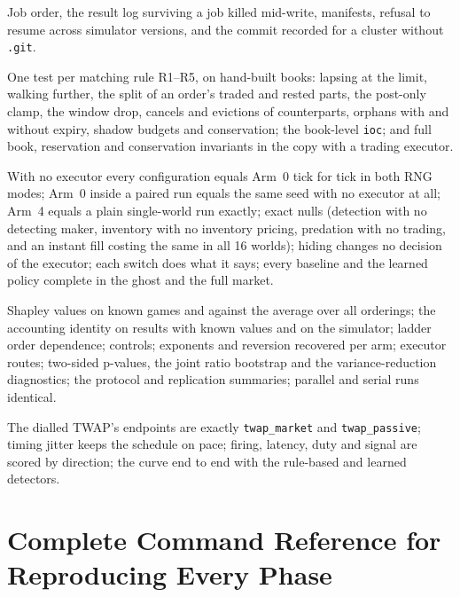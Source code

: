 \documentclass[11pt,a4paper]{article}
\newcommand{\code}[1]{\texttt{#1}}
\begin{document}
\begin{description}[nosep]
\item[\code{test\_runner.py}] Job order, the result log surviving a job killed mid-write, manifests, refusal to resume across simulator versions, and the commit recorded for a cluster without \code{.git}.
\item[\code{test\_ghost.py}] One test per matching rule R1--R5, on hand-built books: lapsing at the limit, walking further, the split of an order's traded and rested parts, the post-only clamp, the window drop, cancels and evictions of counterparts, orphans with and without expiry, shadow budgets and conservation; the book-level \code{ioc}; and full book, reservation and conservation invariants in the copy with a trading executor.
\item[\code{test\_counterfactual.py}] With no executor every configuration equals Arm~0 tick for tick in both RNG modes; Arm~0 inside a paired run equals the same seed with no executor at all; Arm~4 equals a plain single-world run exactly; exact nulls (detection with no detecting maker, inventory with no inventory pricing, predation with no trading, and an instant fill costing the same in all 16 worlds); hiding changes no decision of the executor; each switch does what it says; every baseline and the learned policy complete in the ghost and the full market.
\item[\code{test\_decomposition.py} (\code{papers/decomposition/tests/})] Shapley values on known games and against the average over all orderings; the accounting identity on results with known values and on the simulator; ladder order dependence; controls; exponents and reversion recovered per arm; executor routes; two-sided p-values, the joint ratio bootstrap and the variance-reduction diagnostics; the protocol and replication summaries; parallel and serial runs identical.
\item[\code{test\_detection\_curve.py} (\code{papers/decomposition/tests/})] The dialled TWAP's endpoints are exactly \code{twap\_market} and \code{twap\_passive}; timing jitter keeps the schedule on pace; firing, latency, duty and signal are scored by direction; the curve end to end with the rule-based and learned detectors.
\end{description}

\section{Complete Command Reference for Reproducing Every Phase}
\label{sec:repro_all}
\end{document}
